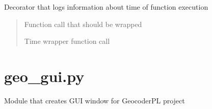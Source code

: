 \documentclass[letterpaper,10pt,english]{sphinxmanual}
\begin{document}

\begin{fulllineitems}
\label{\detokenize{geo_utilities:geo_utilities.time_decorator}}
\pysigstartsignatures
{}
\pysigstopsignatures
\sphinxAtStartPar
Decorator that logs information about time of function execution
\begin{quote}\begin{description}
\sphinxAtStartPar
{} \textendash{} Function call that should be wrapped

\sphinxAtStartPar
{}

\sphinxAtStartPar
Time wrapper function call

\end{description}\end{quote}

\end{fulllineitems}


\sphinxstepscope


\chapter{geo\_gui.py}
\label{\detokenize{geo_gui:module-geo_gui}}\label{\detokenize{geo_gui:geo-gui-py}}\label{\detokenize{geo_gui::doc}}
\sphinxAtStartPar
Module that creates GUI window for GeocoderPL project
\end{document}
